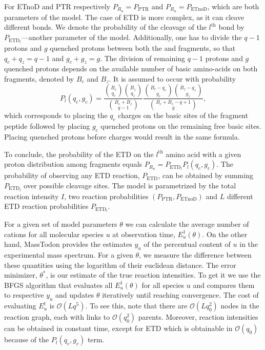 \documentclass{llncs}
\begin{document}
For ETnoD and PTR respectively $P_{R_u}=P_\text{PTR}$ and $P_{R_u}=P_\text{ETnoD}$, which are both parameters of the model.
The case of ETD is more complex, as it can cleave different bonds.
We denote the probability of the cleavage of the $l^\text{th}$ bond by $P_{\text{ETD}_l}$---another parameter of the model.
Additionally, one has to divide the $q-1$ protons and $g$ quenched protons between both the  and  fragments, so that $q_c+q_z=q-1$ and $g_c+g_z = g$.
The division of remaining $q-1$ protons and $g$ quenched protons depends on the available number of basic amino-acids on both fragments, denoted by $B_c$ and $B_z$.
It is assumed to occur with probability
$$P_l(q_c, g_c) = \frac{ \binom{B_c}{q_c}\binom{B_z}{q_z} }{ \binom{B_c+B_z}{q-1} } \frac{ \binom{B_c - q_c}{g_c} \binom{B_z-q_z}{g_z} }{ \binom{B_c+B_z-q+1}{g} },$$
which corresponds to placing the $q_c$ charges on the basic sites of the fragment peptide followed by placing $g_c$ quenched protons on the remaining free basic sites. Placing quenched protons before charges would result in the same formula.

To conclude, the probability of the ETD on the $l^\text{th}$ amino acid with a given proton distribution among fragments equals $P_{R_u}=P_{\text{ETD}_l} P_l(q_c, g_c)$.
The probability of observing any ETD reaction, $P_\text{ETD}$, can be obtained by summing $P_{\text{ETD}_l}$ over possible cleavage sites.
The model is parametrized by the total reaction intensity $I$, two reaction probabilities $(P_\text{PTR}, P_\text{ETnoD})$ and $L$ different ETD reaction probabilities $P_{\text{ETD}_l}$.

For a given set of model parameters $\theta$ we can calculate the average number of cations for all molecular species $u$ at observation time, $E_u^1(\theta)$. On the other hand, {\sc MassTodon} provides the estimates $y_u$ of the percentual content of $u$ in the experimental mass spectrum. For a given $\theta$, we measure the difference between these quantities using the logarithm of their euclidean distance. The error minimizer, $\theta^*$, is our estimate of the true reaction intensities.
To get it we use the BFGS algorithm that evaluates all $E_u^1(\theta)$ for all species $u$ and compares them to respective $y_u$ and updates $\theta$ iteratively until reaching convergence.
The cost of evaluating $E_u^t$ is $\mathcal O(Lq^5)$.
To see this, note that there are $\mathcal O (Lq_0^2)$ nodes in the reaction graph, each with links to $\mathcal O(q_0^2)$ parents.
Moreover, reaction intensities can be obtained in constant time, except for ETD which is obtainable in $\mathcal O(q_0)$ because of the  $P_l(q_c, g_c)$ term.
\end{document}
